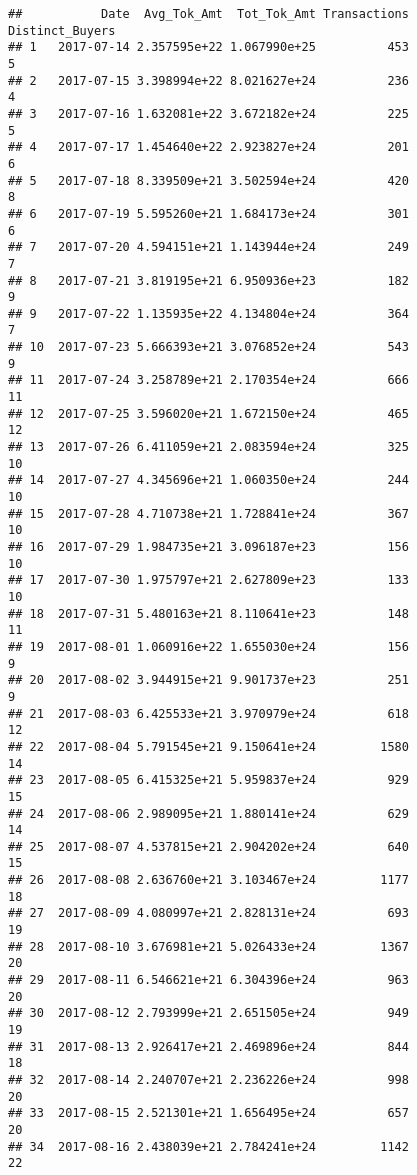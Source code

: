 \documentclass[]{article}
\begin{document}
\begin{verbatim}
##           Date  Avg_Tok_Amt  Tot_Tok_Amt Transactions Distinct_Buyers
## 1   2017-07-14 2.357595e+22 1.067990e+25          453               5
## 2   2017-07-15 3.398994e+22 8.021627e+24          236               4
## 3   2017-07-16 1.632081e+22 3.672182e+24          225               5
## 4   2017-07-17 1.454640e+22 2.923827e+24          201               6
## 5   2017-07-18 8.339509e+21 3.502594e+24          420               8
## 6   2017-07-19 5.595260e+21 1.684173e+24          301               6
## 7   2017-07-20 4.594151e+21 1.143944e+24          249               7
## 8   2017-07-21 3.819195e+21 6.950936e+23          182               9
## 9   2017-07-22 1.135935e+22 4.134804e+24          364               7
## 10  2017-07-23 5.666393e+21 3.076852e+24          543               9
## 11  2017-07-24 3.258789e+21 2.170354e+24          666              11
## 12  2017-07-25 3.596020e+21 1.672150e+24          465              12
## 13  2017-07-26 6.411059e+21 2.083594e+24          325              10
## 14  2017-07-27 4.345696e+21 1.060350e+24          244              10
## 15  2017-07-28 4.710738e+21 1.728841e+24          367              10
## 16  2017-07-29 1.984735e+21 3.096187e+23          156              10
## 17  2017-07-30 1.975797e+21 2.627809e+23          133              10
## 18  2017-07-31 5.480163e+21 8.110641e+23          148              11
## 19  2017-08-01 1.060916e+22 1.655030e+24          156               9
## 20  2017-08-02 3.944915e+21 9.901737e+23          251               9
## 21  2017-08-03 6.425533e+21 3.970979e+24          618              12
## 22  2017-08-04 5.791545e+21 9.150641e+24         1580              14
## 23  2017-08-05 6.415325e+21 5.959837e+24          929              15
## 24  2017-08-06 2.989095e+21 1.880141e+24          629              14
## 25  2017-08-07 4.537815e+21 2.904202e+24          640              15
## 26  2017-08-08 2.636760e+21 3.103467e+24         1177              18
## 27  2017-08-09 4.080997e+21 2.828131e+24          693              19
## 28  2017-08-10 3.676981e+21 5.026433e+24         1367              20
## 29  2017-08-11 6.546621e+21 6.304396e+24          963              20
## 30  2017-08-12 2.793999e+21 2.651505e+24          949              19
## 31  2017-08-13 2.926417e+21 2.469896e+24          844              18
## 32  2017-08-14 2.240707e+21 2.236226e+24          998              20
## 33  2017-08-15 2.521301e+21 1.656495e+24          657              20
## 34  2017-08-16 2.438039e+21 2.784241e+24         1142              22

\end{verbatim}
\end{document}
